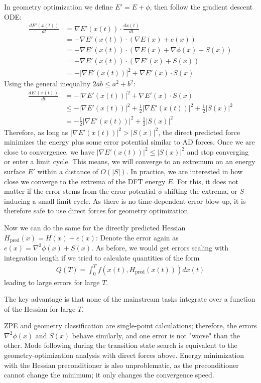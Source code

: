 \documentclass[pdflatex,sn-mathphys-num]{sn-jnl}%
\begin{document}
In geometry optimization we define $E' = E + \phi$, then follow the gradient descent ODE:
\begin{align}
\frac{dE'(x(t))}{dt} &= \nabla E'(x(t)) \cdot \frac{d x(t)}{dt} \\
&= -\nabla E'(x(t)) \cdot (\nabla E(x) + e(x)) \\
&= -\nabla E'(x(t)) \cdot (\nabla E(x) + \nabla\phi(x) + S(x)) \\
&= -\nabla E'(x(t)) \cdot (\nabla E'(x)  + S(x)) \\
&= -|\nabla E'(x(t))|^2 + \nabla E'(x) \cdot S(x)
\end{align}
Using the general inequality $2ab \leq a^2 + b^2$:
\begin{align}
\frac{dE'(x(t))}{dt} &= -|\nabla E'(x(t))|^2 + \nabla E'(x) \cdot S(x) \\
&\leq -|\nabla E'(x(t))|^2 + \frac{1}{2}|\nabla E'(x(t))|^2 + \frac{1}{2}|S(x)|^2 \\
&=-\frac{1}{2}|\nabla E'(x(t))|^2 + \frac{1}{2}|S(x)|^2
\end{align}
Therefore, as long as $|\nabla E'(x(t))|^2 > |S(x)|^2$, the direct predicted force minimizes the energy plus some error potential similar to AD forces. Once we are close to convergence, we have $|\nabla E'(x(t))|^2 \leq |S(x)|^2$ and stop converging or enter a limit cycle. This means, we will converge to an extremum on an energy surface $E'$ within a distance of $O(|S|)$. In practice, we are interested in how close we converge to the extrema of the DFT energy $E$. For this, it does not matter if the error stems from the error potential $\phi$ shifting the extrema, or $S$ inducing a small limit cycle. 
As there is no time-dependent error blow-up, it is therefore safe to use direct forces for geometry optimization. 

Now we can do the same for the directly predicted Hessian $H_\text{pred}(x) = H(x) + e(x)$:
Denote the error again as $e(x) = \nabla^2\phi(x) + S(x)$. 
As before, we would get errors scaling with integration length if we tried to calculate quantities of the form
\begin{align}
Q(T) = \int_0^T f(x(t),  H_\text{pred}(x(t))) dx(t)
\end{align}
leading to large errors for large $T$. 

The key advantage is that none of the mainstream tasks integrate over a function of the Hessian for large $T$.

ZPE and geometry classification are single-point calculations; therefore, the errors $\nabla^2\phi(x)$ and $S(x)$ behave similarly, and one error is not "worse" than the other. 
Mode following during the transition state search is equivalent to the geometry-optimization analysis with direct forces above. Energy minimization with the Hessian preconditioner is also unproblematic, as the preconditioner cannot change the minimum; it only changes the convergence speed. 
\end{document}
